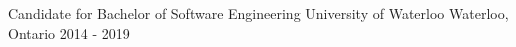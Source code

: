 


\begin{cventries}


\cventry
{Candidate for Bachelor of Software Engineering} %
{University of Waterloo}
{Waterloo, Ontario} %
    {2014 - 2019} %
{ %
}


\end{cventries}
